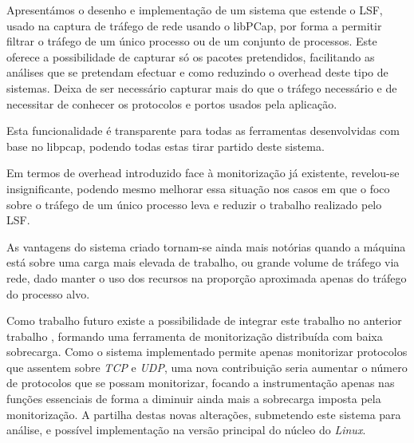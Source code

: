 \documentclass[a4paper]{llncs}
\begin{document}
Apresentámos o desenho e implementação de um sistema que estende o LSF, usado na captura de tráfego de rede usando o libPCap, por forma a permitir filtrar o tráfego de um único processo ou de um conjunto de processos. Este oferece a possibilidade de capturar só os pacotes pretendidos, facilitando as análises que se pretendam efectuar e como reduzindo o overhead deste tipo de sistemas. Deixa de ser necessário capturar mais do que o tráfego necessário e de necessitar de conhecer os protocolos e portos usados pela aplicação.

Esta funcionalidade é transparente para todas as ferramentas desenvolvidas com base no libpcap, podendo todas estas tirar partido deste sistema.

Em termos de overhead introduzido face à monitorização já existente, revelou-se insignificante, podendo mesmo melhorar essa situação nos casos em que o foco sobre o tráfego de um único processo leva e reduzir o trabalho realizado pelo LSF.

As vantagens do sistema criado tornam-se ainda mais notórias quando a máquina está sobre uma carga mais elevada de trabalho, ou grande volume de tráfego via rede, dado manter o uso dos recursos na proporção aproximada apenas do tráfego do processo alvo.

Como trabalho futuro existe a possibilidade de integrar este trabalho no anterior trabalho \cite{Farruca:2009,duarte10}, formando uma ferramenta de monitorização distribuída com baixa sobrecarga. Como o sistema implementado permite apenas monitorizar protocolos que assentem sobre \textit{TCP} e \textit{UDP}, uma nova contribuição seria aumentar o número de protocolos que se possam monitorizar, focando a instrumentação apenas nas funções essenciais de forma a diminuir ainda mais a sobrecarga imposta pela monitorização. A partilha destas novas alterações, submetendo este sistema para análise, e possível implementação na versão principal do núcleo do \textit{Linux}.   




\end{document}
